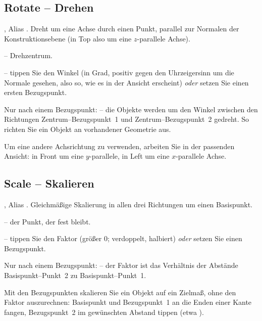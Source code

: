 \subsection{Rotate -- Drehen}\label{sec:cmd-rotate}
, Alias . Dreht um eine Achse durch einen Punkt, parallel zur Normalen der
Konstruktionsebene (in Top also um eine $z$-parallele Achse).
\begin{schritte}
\item {} -- Drehzentrum.
\item {} -- tippen Sie den Winkel (in
  Grad, positiv gegen den Uhrzeigersinn um die Normale gesehen, also so, wie es in der Ansicht
  erscheint) \emph{oder} setzen Sie einen ersten Bezugspunkt.
\item Nur nach einem Bezugspunkt:  -- die Objekte werden
  um den Winkel zwischen den Richtungen Zentrum--Bezugspunkt~1 und Zentrum--Bezugspunkt~2
  gedreht. So richten Sie ein Objekt an vorhandener Geometrie aus.
\end{schritte}
Um eine andere Achsrichtung zu verwenden, arbeiten Sie in der passenden Ansicht: in Front um
eine $y$-parallele, in Left um eine $x$-parallele Achse.

\subsection{Scale -- Skalieren}\label{sec:cmd-scale}
, Alias . Gleichmäßige Skalierung in allen drei Richtungen um einen
Basispunkt.
\begin{schritte}
\item {} -- der Punkt, der fest bleibt.
\item {} -- tippen Sie den Faktor (größer 0;
   verdoppelt,  halbiert) \emph{oder} setzen Sie einen Bezugspunkt.
\item Nur nach einem Bezugspunkt:  -- der Faktor ist das
  Verhältnis der Abstände Basispunkt--Punkt~2 zu Basispunkt--Punkt~1.
\end{schritte}
Mit den Bezugspunkten skalieren Sie ein Objekt auf ein Zielmaß, ohne den Faktor auszurechnen:
Basispunkt und Bezugspunkt~1 an die Enden einer Kante fangen, Bezugspunkt~2 im gewünschten
Abstand tippen (etwa ).


